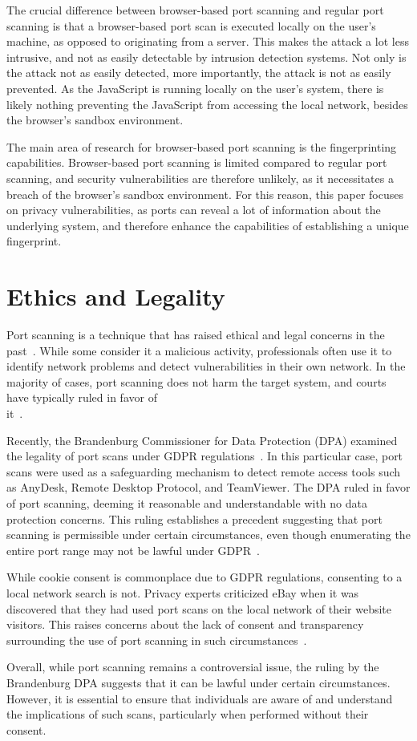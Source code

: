 The crucial difference between browser-based port scanning and regular port scanning is that a browser-based port scan is executed locally on the user's machine, as opposed to originating from a server. 
This makes the attack a lot less intrusive, and not as easily detectable by intrusion detection systems. 
Not only is the attack not as easily detected, more importantly, the attack is not as easily prevented.
As the JavaScript is running locally on the user's system, there is likely nothing preventing the JavaScript from accessing the local network, besides the browser's sandbox environment.

The main area of research for browser-based port scanning is the fingerprinting capabilities. 
Browser-based port scanning is limited compared to regular port scanning, and security vulnerabilities are therefore unlikely, as it necessitates a breach of the browser's sandbox environment. For this reason, this paper focuses on privacy vulnerabilities, as ports can reveal a lot of information about the underlying system, and therefore enhance the capabilities of establishing a unique fingerprint.


\section{Ethics and Legality}
Port scanning is a technique that has raised ethical and legal concerns in the past~\cite{jamieson2001}. While some consider it a malicious activity, professionals often use it to identify network problems and detect vulnerabilities in their own network. In the majority of cases, port scanning does not harm the target system, and courts have typically ruled in favor of \\ it~\cite{Lyon2009}.

Recently, the Brandenburg Commissioner for Data Protection (DPA) examined the legality of port scans under GDPR regulations~\cite{gdpr}. In this particular case, port scans were used as a safeguarding mechanism to detect remote access tools such as AnyDesk, Remote Desktop Protocol, and TeamViewer. The DPA ruled in favor of port scanning, deeming it reasonable and understandable with no data protection concerns. This ruling establishes a precedent suggesting that port scanning is permissible under certain circumstances, even though enumerating the entire port range may not be lawful under GDPR~\cite{edpb_decision}.

While cookie consent is commonplace due to GDPR regulations, consenting to a local network search is not. Privacy experts criticized eBay when it was discovered that they had used port scans on the local network of their website visitors. This raises concerns about the lack of consent and transparency surrounding the use of port scanning in such circumstances~\cite{ebay_port_scans,forbes_ebay}.

Overall, while port scanning remains a controversial issue, the ruling by the Brandenburg DPA suggests that it can be lawful under certain circumstances. However, it is essential to ensure that individuals are aware of and understand the implications of such scans, particularly when performed without their consent.